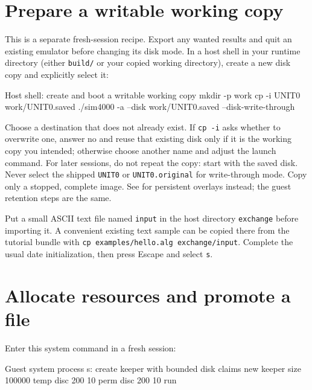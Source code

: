 \section{Prepare a writable working copy}\label{prepare-a-writable-working-copy}

This is a separate fresh-session recipe. Export any wanted results and quit
an existing emulator before changing its disk mode. In a host shell in your
runtime directory (either \texttt{build/} or your copied working directory),
create a new disk copy and explicitly select it:

\begin{commandexample}[language=sh]{Host shell: create and boot a writable working copy}
mkdir -p work
cp -i UNIT0 work/UNIT0.saved
./sim4000 -a --disk work/UNIT0.saved --disk-write-through
\end{commandexample}

Choose a destination that does not already exist. If \texttt{cp -i} asks whether
to overwrite one, answer no and reuse that existing disk only if it is the
working copy you intended; otherwise choose another name and adjust the launch
command. For later sessions, do not repeat the copy: start with the saved disk.
Never select the shipped \texttt{UNIT0} or \texttt{UNIT0.original} for write-through
mode. Copy only a stopped, complete image. See
for persistent overlays instead; the guest retention steps are the same.

Put a small ASCII text file named \passthrough{\lstinline!input!} in the host directory \passthrough{\lstinline!exchange!} before importing it. A convenient existing text sample can be copied there from the tutorial bundle with \passthrough{\lstinline!cp examples/hello.alg exchange/input!}. Complete the usual date initialization, then press Escape and select \passthrough{\lstinline!s!}.

\section{Allocate resources and promote a file}\label{allocate-resources-and-promote-a-file}

Enter this system command in a fresh session:

\begin{commandexample}{Guest system process s: create keeper with bounded disk claims}
new keeper size 100000 temp disc 200 10 perm disc 200 10 run
\end{commandexample}

